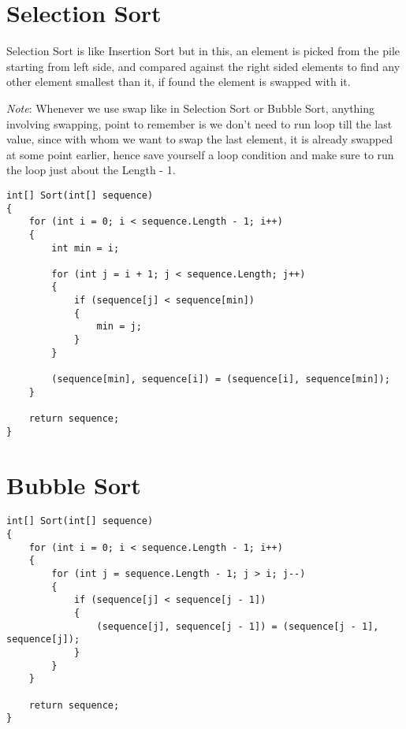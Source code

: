 \documentclass[a4paper,12pt]{article}
\begin{document}
	\section{Selection Sort}
	Selection Sort is like Insertion Sort but in this, an element is picked from the pile starting from left side, and compared against the right sided elements to find any other element smallest than it, if found the element is swapped with it.
	
	\emph{Note}: Whenever we use swap like in Selection Sort or Bubble Sort, anything involving swapping, point to remember is we don't need to run loop till the last value, since with whom we want to swap the last element, it is already swapped at some point earlier, hence save yourself a loop condition and make sure to run the loop just about the Length - 1.
	\begin{verbatim}
int[] Sort(int[] sequence)
{
	for (int i = 0; i < sequence.Length - 1; i++)
	{
		int min = i;
		
		for (int j = i + 1; j < sequence.Length; j++)
		{
			if (sequence[j] < sequence[min])
			{
				min = j;
			}
		}
		
		(sequence[min], sequence[i]) = (sequence[i], sequence[min]);
	}
	
	return sequence;
}
	\end{verbatim}
	
	\section{Bubble Sort}
	\begin{verbatim}
int[] Sort(int[] sequence)
{
	for (int i = 0; i < sequence.Length - 1; i++)
	{
		for (int j = sequence.Length - 1; j > i; j--)
		{
			if (sequence[j] < sequence[j - 1])
			{
				(sequence[j], sequence[j - 1]) = (sequence[j - 1], sequence[j]);
			}
		}
	}
	
	return sequence;
}
	\end{verbatim}
	
\end{document}
